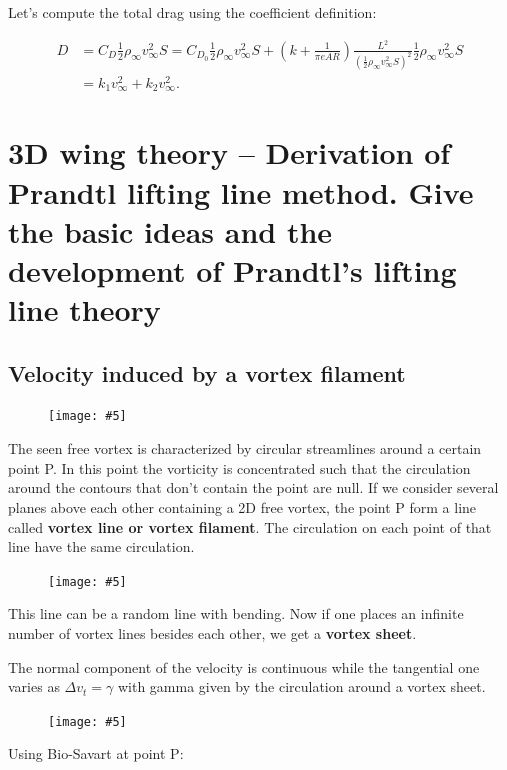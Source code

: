 \documentclass[british,french,11pt, a4paper, openany]{article}
\newcommand{\wrapfig}[6]{%
	\begin{figure}%
		\vspace{-5mm}%
		\texttt{[image: \#5]}%
		\captionof{figure}{}%
		\label{#6}%
	\end{figure}%
}
\begin{document}
Let's compute the total drag using the coefficient definition:

\begin{equation}
\begin{aligned}
D &= C_D \frac{1}{2} \rho _\infty v_\infty ^2 S = C_{D_0} \frac{1}{2} \rho _\infty v_\infty ^2 S + \left(k +\frac{1}{\pi e AR} \right)\frac{L^2}{( \frac{1}{2} \rho _\infty v_\infty ^2 S)^2} \frac{1}{2} \rho _\infty v_\infty ^2 S \\
&= k_1 v_\infty ^2 + k_2 v_\infty^2.
\end{aligned}
\label{eq:3.7}
\end{equation}



\section{3D wing theory – Derivation of Prandtl lifting line method. Give the basic ideas and the development of Prandtl’s lifting line theory}

\subsection{Velocity induced by a vortex filament}
\wrapfig{6}{l}{7}{0.12}{ch3/11}{fig:3.11}
The seen free vortex is characterized by circular streamlines around a certain point P. In this point the vorticity is concentrated such that the circulation around the contours that don't contain the point are null. If we consider several planes above each other containing a 2D free vortex, the point P form a line called \textbf{vortex line or vortex filament}. The circulation on each point of that line have the same circulation.

\wrapfig{6}{l}{6.5}{0.06}{ch3/13}{fig:3.13}
This line can be a random line with bending. Now if one places an infinite number of vortex lines besides each other, we get a \textbf{vortex sheet}.

The normal component of the velocity is continuous while the tangential one varies as $ \Delta v_t = \gamma $ with gamma given by the circulation around a vortex sheet.

\wrapfig{10}{l}{5}{0.1}{ch3/14}{fig:3.14}
Using Bio-Savart at point P:
\end{document}

